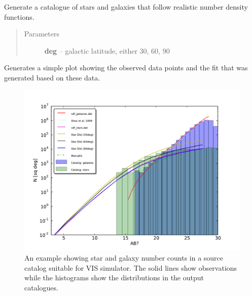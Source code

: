 \documentclass[a4paper,12pt,english]{sphinxmanual}
\begin{document}

\begin{fulllineitems}
\label{sources:sources.createObjectCatalogue.generateCatalog}
Generate a catalogue of stars and galaxies that follow
realistic number density functions.
\begin{quote}\begin{description}
\item[{Parameters}] \leavevmode
\textbf{deg} -- galactic latitude, either 30, 60, 90

\end{description}\end{quote}

\end{fulllineitems}


\begin{fulllineitems}
\label{sources:sources.createObjectCatalogue.plotDistributionFunction}
Generates a simple plot showing the observed data points and the fit
that was generated based on these data.

\end{fulllineitems}

\begin{figure}[htbp]
\centering
\capstart

\includegraphics{Distributions.pdf}
\caption{An example showing star and galaxy number counts in a source catalog suitable for VIS simulator.
The solid lines show observations while the histograms show the distributions in the output catalogues.}\end{figure}
\end{document}
